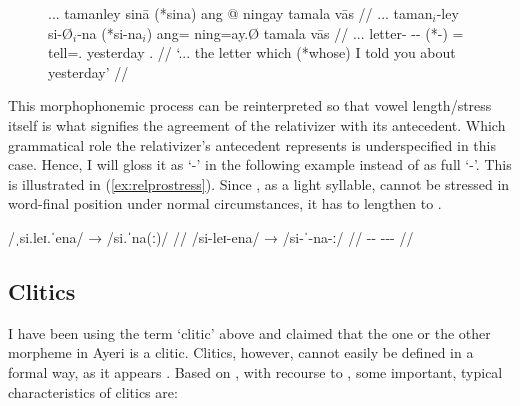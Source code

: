 \begin{figure}
\ex\label{ex:relpromorphphon}
\begingl
	\gla ... tamanley sinā \textup{(}*sina\textup{)} ang @ ningay tamala
		vās //
	\glb ... taman$_i$-ley si-Ø$_i$-na (*si-na$_i$) ang= ning=ay.Ø tamala vās //
	\glc ... letter-\PargI{} \Rel{}-\PatTI{}-\Gen{} (*\Rel{}-\Gen{}) \AgtT{}= 
		tell=\Fsg{}.\Top{} yesterday \Ssg{}.\Parg{} //
	\glft `... the letter which (*whose) I told you about yesterday' //
\endgl\xe
\end{figure}

This morphophonemic process can be reinterpreted so that vowel length/stress itself is what signifies
the agreement of the relativizer with its antecedent. Which grammatical role
the relativizer's antecedent represents is
underspecified in this case. Hence, I will gloss it as `-\Agr{}' in the following example
instead of as full `-\PargI{}'. This is illustrated in (\ref{ex:relprostress}).
Since , as a light syllable, cannot be stressed in word-final
position under normal circumstances, it has to lengthen to .

\ex[everygla=\upshape]\label{ex:relprostress}%
\begingl
	\gla /ˌsi.leɪ.ˈena/ → /si.ˈna(ː)/ //
	\glb /si-leɪ-ena/ → /si-ˈ-na-ː/ //
	\glc \Rel{}-\PargI{}-\Gen{} {} \Rel{}-\Agr{}-\Gen{}-\Agr{} //
\endgl\xe


\subsection{Clitics}
\label{subsec:clitics}

I have been using the term `clitic' above and claimed that the one or the other
morpheme in Ayeri is a clitic. Clitics, however, cannot easily be defined in a
formal way, as it appears \citep[126]{spencerluis2012}. Based on
\citet{spencerluis2012}, with recourse to \citet{zwickypullum1983}, some
important, typical characteristics of clitics are:

